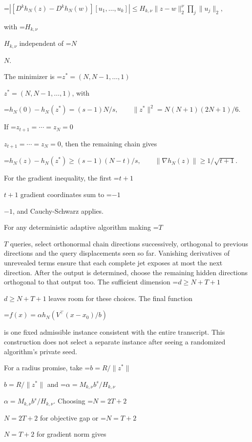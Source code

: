 \documentclass[10pt,a4paper]{article}
\newcommand{\AtlasMath}[1]{\par\begingroup\centering\setbox0=\hbox{$\displaystyle #1$}\ifdim\wd0>1.4\linewidth\typeout{ATLAS WIDE FORMULA: \the\wd0}\fi\ifdim\wd0>\linewidth\resizebox{\linewidth}{!}{\box0}\else\box0\fi\par\endgroup}
\newcommand{\AtlasInlineMath}[1]{\begingroup\setbox0=\hbox{$#1$}\ifdim\wd0>.4\linewidth\endgroup\AtlasMath{#1}\else\endgroup$#1$\fi}
\begin{document}
\AtlasMath{|[D^kh_N(z)-D^kh_N(w)][u_1,\ldots,u_k]|
\le H_{k,\nu}\|z-w\|_2^\nu\prod_j\|u_j\|_2,}



with \AtlasInlineMath{H_{k,\nu}} independent of \AtlasInlineMath{N}.

The minimizer is \AtlasInlineMath{z^*=(N,N-1,\ldots,1)}, with



\AtlasMath{h_N(0)-h_N(z^*)=(s-1)N/s,\qquad
\|z^*\|^2=N(N+1)(2N+1)/6.}



If \AtlasInlineMath{z_{t+1}=\cdots=z_N=0}, then the remaining chain gives



\AtlasMath{h_N(z)-h_N(z^*)\ge(s-1)(N-t)/s,\qquad
\|\nabla h_N(z)\|\ge1/\sqrt{t+1}.}



For the gradient inequality, the first \AtlasInlineMath{t+1} gradient coordinates sum to \AtlasInlineMath{-1}, and Cauchy-Schwarz applies.

For any deterministic adaptive algorithm making \AtlasInlineMath{T} queries, select orthonormal chain directions successively, orthogonal to previous directions and the query displacements seen so far. Vanishing derivatives of unrevealed terms ensure that each complete jet exposes at most the next direction. After the output is determined, choose the remaining hidden directions orthogonal to that output too. The sufficient dimension \AtlasInlineMath{d\ge N+T+1} leaves room for these choices. The final function



\AtlasMath{f(x)=\alpha h_N(V^\top(x-x_0)/b)}



is one fixed admissible instance consistent with the entire transcript. This construction does not select a separate instance after seeing a randomized algorithm's private seed.

For a radius promise, take \AtlasInlineMath{b=R/\|z^*\|} and \AtlasInlineMath{\alpha=M_{k,\nu}b^s/H_{k,\nu}}. Choosing \AtlasInlineMath{N=2T+2} for objective gap or \AtlasInlineMath{N=T+2} for gradient norm gives
\end{document}
